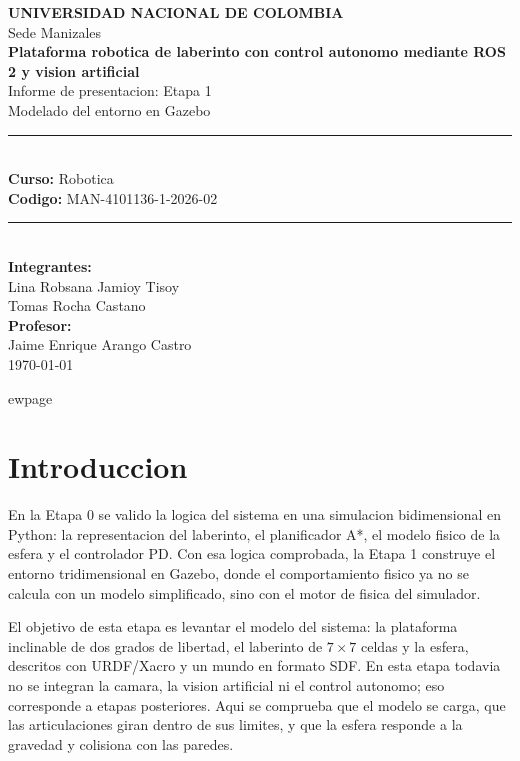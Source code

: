 \documentclass[11pt,a4paper]{article}
\begin{document}
\begin{titlepage}
    \centering
    \vspace*{2cm}
    {\Large \textbf{UNIVERSIDAD NACIONAL DE COLOMBIA}}\\[0.3cm]
    {\large Sede Manizales}\\[2cm]
    {\Huge \textbf{Plataforma robotica de laberinto con control autonomo mediante ROS 2 y vision artificial}}\\[0.5cm]
    {\Large Informe de presentacion: Etapa 1}\\[0.3cm]
    {\large Modelado del entorno en Gazebo}\\[2cm]
    \rule{\linewidth}{0.5mm}\\[0.4cm]
    {\large \textbf{Curso:} Robotica}\\
    {\large \textbf{Codigo:} MAN-4101136-1-2026-02}\\[0.4cm]
    \rule{\linewidth}{0.5mm}\\[1.5cm]
    {\Large \textbf{Integrantes:}}\\[0.4cm]
    {\large Lina Robsana Jamioy Tisoy}\\
    {\large Tomas Rocha Castano}\\[2cm]
    {\large \textbf{Profesor:}}\\
    {\large Jaime Enrique Arango Castro}\\[2cm]
    \vfill
    {\large \today}
\end{titlepage}

\tableofcontents

ewpage

\section{Introduccion}
En la Etapa 0 se valido la logica del sistema en una simulacion bidimensional en Python: la representacion del laberinto, el planificador A*, el modelo fisico de la esfera y el controlador PD. Con esa logica comprobada, la Etapa 1 construye el entorno tridimensional en Gazebo, donde el comportamiento fisico ya no se calcula con un modelo simplificado, sino con el motor de fisica del simulador.

El objetivo de esta etapa es levantar el modelo del sistema: la plataforma inclinable de dos grados de libertad, el laberinto de $7 \times 7$ celdas y la esfera, descritos con URDF/Xacro y un mundo en formato SDF. En esta etapa todavia no se integran la camara, la vision artificial ni el control autonomo; eso corresponde a etapas posteriores. Aqui se comprueba que el modelo se carga, que las articulaciones giran dentro de sus limites, y que la esfera responde a la gravedad y colisiona con las paredes.
\end{document}
